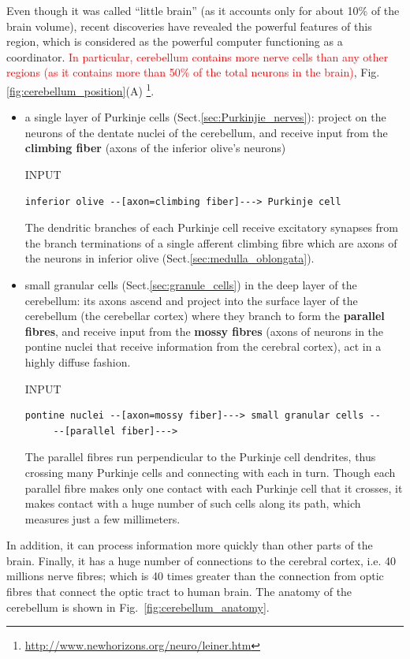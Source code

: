 Even though it was called ``little brain'' (as it accounts only for about
10\% of the brain volume), recent discoveries have revealed the powerful
features of this region, which is considered as the powerful computer functioning as a
coordinator. 
\textcolor{red}{In particular, cerebellum contains more nerve cells than any
other regions (as it contains more than 50\% of the total neurons in
the brain)},
Fig.\ref{fig:cerebellum_position}(A)
\footnote{\url{http://www.newhorizons.org/neuro/leiner.htm}}.
\begin{itemize}
  
  \item a single layer of Purkinje cells (Sect.\ref{sec:Purkinjie_nerves}):
  project on the neurons of the dentate nuclei of the cerebellum, and receive
  input from the {\bf climbing fiber} (axons of the inferior olive's neurons)

INPUT  
\begin{verbatim}
inferior olive --[axon=climbing fiber]---> Purkinje cell
\end{verbatim}
  The dendritic branches of each Purkinje cell receive excitatory synapses from
  the branch terminations of a single afferent climbing fibre which are axons
  of the neurons in inferior olive (Sect.\ref{sec:medulla_oblongata}).

  \item small granular cells (Sect.\ref{sec:granule_cells}) in the deep layer of
  the cerebellum: its axons ascend and project  into the surface layer of the
  cerebellum (the cerebellar cortex) where they branch to form the {\bf parallel
  fibres}, and receive input from the {\bf mossy fibres} (axons of neurons in
  the pontine nuclei that receive information from the cerebral cortex), act in a highly
  diffuse fashion.
  
INPUT  
\begin{verbatim}
pontine nuclei --[axon=mossy fiber]---> small granular cells --
     --[parallel fiber]--->
\end{verbatim}

The parallel fibres run perpendicular to the Purkinje cell dendrites, thus
crossing many Purkinje cells and connecting with each in turn.
Though each parallel fibre makes only one contact with each Purkinje cell that
it crosses, it makes contact with a huge number of such cells along its path,
which measures just a few millimeters.

\end{itemize}
In addition, it can process information more quickly than other parts of the
brain.
Finally, it has a huge number of connections to the cerebral cortex, i.e. 40
millions nerve fibres; which is 40 times greater than the connection from optic
fibres that connect the optic tract to human brain.  The anatomy of the
cerebellum is shown in Fig.~\ref{fig:cerebellum_anatomy}.

